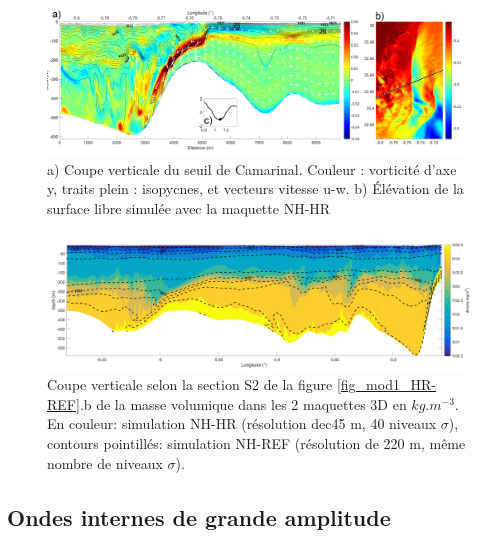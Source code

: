 \documentclass[a4paper,11pt]{report}
\begin{document}
\begin{figure}[!h]
        \includegraphics[width=\textwidth]{./ressaut_2D_it790_vhr_IE2.png}
        \caption{a) Coupe verticale du seuil de Camarinal. Couleur : vorticité d'axe y, traits plein : isopycnes, et vecteurs vitesse u-w. b) Élévation de la surface libre simulée avec la maquette NH-HR}
        \label{fig_ressaut_NH-HR}
        \end{figure}

\begin{figure}[!h]
        \includegraphics[width=\textwidth]{./media/comp_GExO_hr-vhr_IE.png}
        \caption{Coupe verticale selon la section S2 de la figure \ref{fig_mod1_HR-REF}.b de la masse volumique dans les 2 maquettes 3D en $kg.m^{-3}$. En couleur: simulation NH-HR (résolution dec45 m, 40 niveaux $\sigma$), contours pointillés: simulation NH-REF (résolution de 220 m, même nombre de niveaux $\sigma$).}
        \label{Coupe_Melange}
        \end{figure}
  	
\subsection{Ondes internes de grande amplitude}
\end{document}
